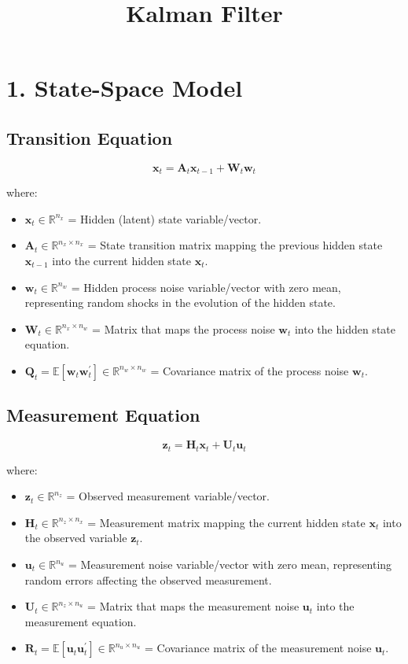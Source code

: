\documentclass[11pt]{article}
\title{Kalman Filter}
\author{}
\date{}
\newcommand{\E}{\mathbb{E}}
\newcommand{\R}{\mathbb{R}}
\newcommand{\trans}{^{\prime}}
\begin{document}
\maketitle

\section*{1. State-Space Model}

\subsection*{Transition Equation}

\[
\mathbf{x}_t
=
\mathbf{A}_t\mathbf{x}_{t-1}
+
\mathbf{W}_t\mathbf{w}_t
\]

where:

\begin{itemize}
    \item $\mathbf{x}_t\in\R^{n_x}$ = Hidden (latent) state variable/vector.
    \item $\mathbf{A}_t\in\R^{n_x\times n_x}$ = State transition matrix mapping the previous hidden state $\mathbf{x}_{t-1}$ into the current hidden state $\mathbf{x}_t$.
    \item $\mathbf{w}_t\in\R^{n_w}$ = Hidden process noise variable/vector with zero mean, representing random shocks in the evolution of the hidden state.
    \item $\mathbf{W}_t\in\R^{n_x\times n_w}$ = Matrix that maps the process noise $\mathbf{w}_t$ into the hidden state equation.
    \item $\mathbf{Q}_t=\E[\mathbf{w}_t\mathbf{w}_t\trans]\in\R^{n_w\times n_w}$ = Covariance matrix of the process noise $\mathbf{w}_t$.
\end{itemize}

\subsection*{Measurement Equation}

\[
\mathbf{z}_t
=
\mathbf{H}_t\mathbf{x}_t
+
\mathbf{U}_t\mathbf{u}_t
\]

where:

\begin{itemize}
    \item $\mathbf{z}_t\in\R^{n_z}$ = Observed measurement variable/vector.
    \item $\mathbf{H}_t\in\R^{n_z\times n_x}$ = Measurement matrix mapping the current hidden state $\mathbf{x}_t$ into the observed variable $\mathbf{z}_t$.
    \item $\mathbf{u}_t\in\R^{n_u}$ = Measurement noise variable/vector with zero mean, representing random errors affecting the observed measurement.
    \item $\mathbf{U}_t\in\R^{n_z\times n_u}$ = Matrix that maps the measurement noise $\mathbf{u}_t$ into the measurement equation.
    \item $\mathbf{R}_t=\E[\mathbf{u}_t\mathbf{u}_t\trans]\in\R^{n_u\times n_u}$ = Covariance matrix of the measurement noise $\mathbf{u}_t$.
\end{itemize}
\end{document}
